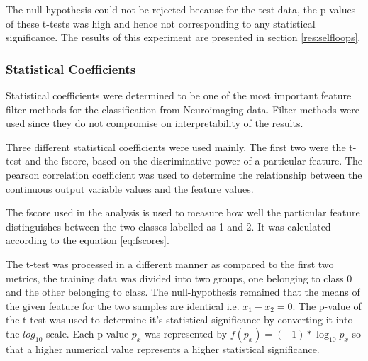 \documentclass[msthesis.tex]{subfiles}
\begin{document}
The null hypothesis could not be rejected because for the test data, the p-values of these t-tests was high and hence not corresponding to any statistical significance. The results of this experiment are presented in section \ref{res:selfloops}. 

\subsubsection{Statistical Coefficients}
\label{subsub:statcoef}

Statistical coefficients were determined to be one of the most important feature filter methods for the classification from Neuroimaging data. Filter methods were used since they do not compromise on interpretability of the results.

Three different statistical coefficients were used mainly. The first two were the t-test and the fscore, based on the discriminative power of a particular feature. The pearson correlation coefficient was used to determine the relationship between the continuous output variable values and the feature values. 

The fscore used in the analysis is used to measure how well the particular feature distinguishes between the two classes labelled as 1 and 2. It  was calculated according to the equation \ref{eq:fscores}. 

The t-test was processed in a different manner as compared to the first two metrics, the training data was divided into two groups, one belonging to class 0 and the other belonging to class. The null-hypothesis remained that the means of the given feature for the two samples are identical i.e. $\overline{x_{1}} - \overline{x_{2}} = 0$. The p-value of the t-test was used to determine it's statistical significance by converting it into the $log_10$ scale. Each p-value $p_x$ was represented by $ f(p_{x}) = (-1)*\log_{10} p_x$ so that a higher numerical value represents a higher statistical significance.
\end{document}
